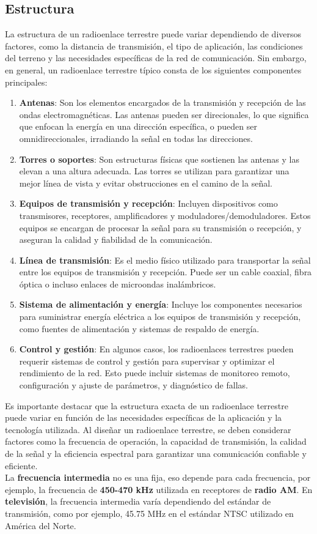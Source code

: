 \documentclass[
	12pt, %
	fleqn, %
	a4paper, %
	oneside, %
]{LegrandOrangeBook}
\begin{document}
\subsection{Estructura}
La estructura de un radioenlace terrestre puede variar dependiendo de diversos factores, como la distancia de transmisión, el tipo de aplicación, las condiciones del terreno y las necesidades específicas de la red de comunicación. Sin embargo, en general, un radioenlace terrestre típico consta de los siguientes componentes principales:
\begin{enumerate}
\item \textbf{Antenas}: Son los elementos encargados de la transmisión y recepción de las ondas electromagnéticas. Las antenas pueden ser direcionales, lo que significa que enfocan la energía en una dirección específica, o pueden ser omnidireccionales, irradiando la señal en todas las direcciones.
\item \textbf{Torres o soportes}: Son estructuras físicas que sostienen las antenas y las elevan a una altura adecuada. Las torres se utilizan para garantizar una mejor línea de vista y evitar obstrucciones en el camino de la señal.
\item \textbf{Equipos de transmisión y recepción}: Incluyen dispositivos como transmisores, receptores, amplificadores y moduladores/demoduladores. Estos equipos se encargan de procesar la señal para su transmisión o recepción, y aseguran la calidad y fiabilidad de la comunicación.
\item \textbf{Línea de transmisión}: Es el medio físico utilizado para transportar la señal entre los equipos de transmisión y recepción. Puede ser un cable coaxial, fibra óptica o incluso enlaces de microondas inalámbricos.
\item \textbf{Sistema de alimentación y energía}: Incluye los componentes necesarios para suministrar energía eléctrica a los equipos de transmisión y recepción, como fuentes de alimentación y sistemas de respaldo de energía.
\item \textbf{Control y gestión}: En algunos casos, los radioenlaces terrestres pueden requerir sistemas de control y gestión para supervisar y optimizar el rendimiento de la red. Esto puede incluir sistemas de monitoreo remoto, configuración y ajuste de parámetros, y diagnóstico de fallas.
\end{enumerate}
Es importante destacar que la estructura exacta de un radioenlace terrestre puede variar en función de las necesidades específicas de la aplicación y la tecnología utilizada. Al diseñar un radioenlace terrestre, se deben considerar factores como la frecuencia de operación, la capacidad de transmisión, la calidad de la señal y la eficiencia espectral para garantizar una comunicación confiable y eficiente.\\
La \textbf{frecuencia intermedia} no es una fija, eso depende para cada frecuencia, por ejemplo, la frecuencia de \textbf{450-470 kHz} utilizada en receptores de \textbf{radio AM}. En \textbf{televisión}, la frecuencia intermedia varía dependiendo del estándar de transmisión, como por ejemplo, 45.75 MHz en el estándar NTSC utilizado en América del Norte.
\end{document}
